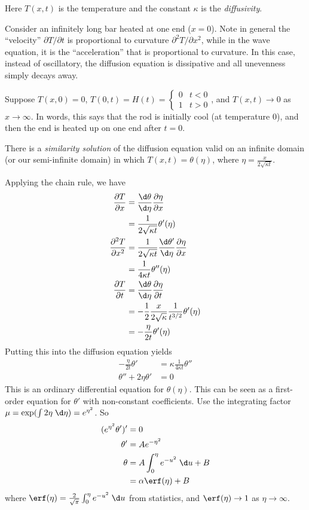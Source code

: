 \documentclass[a4paper]{article}
\begin{document}
Here $T(x, t)$ is the temperature and the constant $\kappa$ is the \emph{diffusivity}.

\begin{eg}
  Consider an infinitely long bar heated at one end ($x = 0$). Note in general the ``velocity'' $\partial T/\partial t$ is proportional to curvature $\partial^2 T/\partial x^2$, while in the wave equation, it is the ``acceleration'' that is proportional to curvature. In this case, instead of oscillatory, the diffusion equation is dissipative and all unevenness simply decays away.

  Suppose $T(x,0) = 0$, $T(0, t) = H(t) =
  \begin{cases}
    0 & t < 0\\
    1 & t > 0
  \end{cases}$, and $T(x, t)\to 0$ as $x\to \infty$. In words, this says that the rod is initially cool (at temperature $0$), and then the end is heated up on one end after $t = 0$.

  There is a \emph{similarity solution} of the diffusion equation valid on an infinite domain (or our semi-infinite domain) in which $T(x, t) = \theta(\eta)$, where $\displaystyle \eta = \frac{x}{2\sqrt{\kappa t}}$.

  Applying the chain rule, we have
  \begin{align*}
    \frac{\partial T}{\partial x} &= \frac{\d \theta}{\d \eta} \frac{\partial \eta}{\partial x}\\
    &= \frac{1}{2\sqrt{\kappa t}} \theta'(\eta)\\
    \frac{\partial^2 T}{\partial x^2} &= \frac{1}{2\sqrt{\kappa t}} \frac{\d\theta'}{\d\eta}\frac{\partial \eta}{\partial x}\\
    &= \frac{1}{4\kappa t}\theta''(\eta)\\
    \frac{\partial T}{\partial t} &= \frac{\d \theta}{\d \eta}\frac{\partial \eta}{\partial t}\\
    &= -\frac{1}{2}\frac{x}{2\sqrt{\kappa}}\frac{1}{t^{3/2}} \theta'(\eta)\\
    &= -\frac{\eta}{2t}\theta'(\eta)
  \end{align*}
  Putting this into the diffusion equation yields
  \begin{align*}
    -\frac{\eta}{2t}\theta' &= \kappa \frac{1}{4\kappa t}\theta''\\
    \theta'' + 2\eta\theta' &= 0
  \end{align*}
  This is an ordinary differential equation for $\theta(\eta)$. This can be seen as a first-order equation for $\theta'$ with non-constant coefficients. Use the integrating factor $\mu = \exp(\int 2\eta \;\d \eta) = e^{\eta^2}$. So
  \begin{align*}
    (e^{\eta^2}\theta')' &= 0\\
    \theta' &= Ae^{-\eta^2}\\
    \theta &= A\int_0^\eta e^{-u^2}\;\d u + B\\
    &= \alpha\erf(\eta) + B
  \end{align*}
  where $\erf(\eta) = \frac{2}{\sqrt{\pi}} \int_0^\eta e^{-u^2}\;\d u$ from statistics, and $\erf(\eta)\to 1$ as $\eta\to \infty$.


\end{eg}
\end{document}
